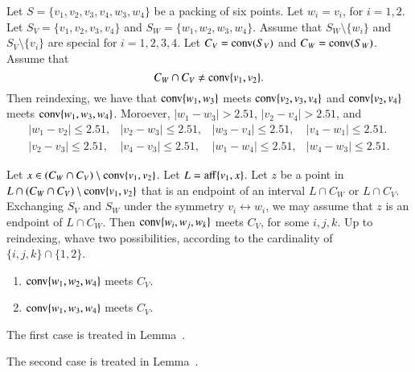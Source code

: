\begin{tarskidata}
\begin{tarski}
\begin{lemma}
Let $S=\{v_1,v_2,v_3,v_4,w_3,w_4\}$ be a packing of six points.
Let $w_i=v_i$, for $i=1,2$.  Let $S_V=\{v_1,v_2,v_3,v_4\}$
and $S_W=\{w_1,w_2,w_3,w_4\}$. 
Assume that $S_W\setminus \{w_i\}$ and $S_V\setminus\{v_i\}$
are special for $i=1,2,3,4$.
 Let $C_V = {\operatorname{conv}}(S_V)$ and
$C_W={\operatorname{conv}}(S_W)$.  Assume that 
   $$
   C_W \cap C_V \ne {\operatorname{conv}}\{v_1,v_2\}.
   $$
Then reindexing,
we have that ${\operatorname{conv}}\{w_1,w_3\}$ meets ${\operatorname{conv}}\{v_2,v_3,v_4\}$
and ${\operatorname{conv}}\{v_2,v_4\}$ meets ${\operatorname{conv}}\{w_1,w_3,w_4\}$.  Moroever,
$|w_1-w_3|>2.51$, $|v_2-v_4|>2.51$,
and
  $$
  \begin{array}{llll}
  |w_1-v_2|\le 2.51,&|v_2-w_3|\le 2.51,& |w_3-v_4|\le 2.51,&
  |v_4-w_1|\le 2.51.\\
  |v_2-v_3|\le 2.51,&|v_4-v_3|\le 2.51,& |w_1-w_4|\le 2.51,&
  |w_4-w_3|\le 2.51.
  \end{array}
  $$
\end{lemma}

\begin{proved}
Let $x\in (C_W\cap C_V)\setminus {\operatorname{conv}}\{v_1,v_2\}$.
Let $L={\operatorname{aff}}\{v_1,x\}$.  Let $z$ be a point in 
$L\cap (C_W\cap C_V)\setminus{\operatorname{conv}}\{v_1,v_2\}$ that is
an endpoint of an interval $L\cap C_W$ or $L\cap C_V$.   Exchanging
$S_V$ and $S_W$ under the symmetry $v_i\leftrightarrow w_i$,
we may assume that $z$ is an endpoint of $L\cap C_W$.  
Then ${\operatorname{conv}}\{w_i,w_j,w_k\}$ meets $C_V$, for some $i,j,k$.
Up to reindexing, 
whave two possibilities, according to the cardinality of
$\{i,j,k\}\cap\{1,2\}$.
\begin{enumerate}
  \item ${\operatorname{conv}}\{w_1,w_2,w_4\}$ meets $C_V$.
  \item ${\operatorname{conv}}\{w_1,w_3,w_4\}$ meets $C_V$.
\end{enumerate}

The first case is treated in Lemma~.

The second case is treated in Lemma~.
\swallowed\end{proved}
\end{tarski}








\begin{tarski}


\end{tarski}
\end{tarskidata}
